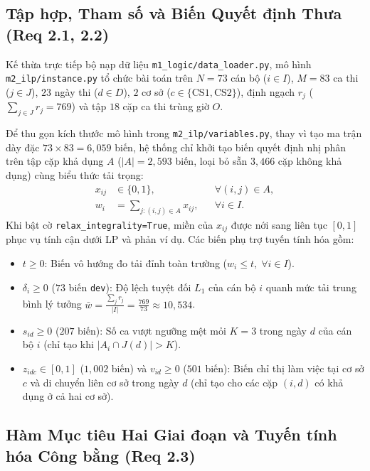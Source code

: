 \subsection{Tập hợp, Tham số và Biến Quyết định Thưa (Req 2.1, 2.2)}
\label{sec:m2_formulation}

Kế thừa trực tiếp bộ nạp dữ liệu \texttt{m1\_logic/data\_loader.py}, mô hình \texttt{m2\_ilp/instance.py} tổ chức bài toán trên $N = 73$ cán bộ ($i \in I$), $M = 83$ ca thi ($j \in J$), $23$ ngày thi ($d \in D$), $2$ cơ sở ($c \in \{\text{CS1}, \text{CS2}\}$), định ngạch $r_j$ ($\sum_{j \in J} r_j = 769$) và tập $18$ cặp ca thi trùng giờ $O$.

Để thu gọn kích thước mô hình trong \texttt{m2\_ilp/variables.py}, thay vì tạo ma trận dày đặc $73 \times 83 = 6{,}059$ biến, hệ thống chỉ khởi tạo biến quyết định nhị phân trên tập cặp khả dụng $A$ ($|A| = 2{,}593$ biến, loại bỏ sẵn $3{,}466$ cặp không khả dụng) cùng biểu thức tải trọng:
\begin{equation}
\begin{aligned}
    x_{ij} &\in \{0, 1\}, && \forall (i, j) \in A, \\
    w_i &= \sum_{j: (i, j) \in A} x_{ij}, && \forall i \in I.
\end{aligned}
\end{equation}
Khi bật cờ \texttt{relax\_integrality=True}, miền của $x_{ij}$ được nới sang liên tục $[0, 1]$ phục vụ tính cận dưới LP và phản ví dụ. Các biến phụ trợ tuyến tính hóa gồm:
\begin{itemize}
    \item $t \ge 0$: Biến vô hướng đo tải đỉnh toàn trường ($w_i \le t, \; \forall i \in I$).
    \item $\delta_i \ge 0$ ($73$ biến \texttt{dev}): Độ lệch tuyệt đối $L_1$ của cán bộ $i$ quanh mức tải trung bình lý tưởng $\bar{w} = \frac{\sum_j r_j}{|I|} = \frac{769}{73} \approx 10{,}534$.
    \item $s_{id} \ge 0$ ($207$ biến): Số ca vượt ngưỡng mệt mỏi $K = 3$ trong ngày $d$ của cán bộ $i$ (chỉ tạo khi $|A_i \cap J(d)| > K$).
    \item $z_{idc} \in [0, 1]$ ($1{,}002$ biến) và $v_{id} \ge 0$ ($501$ biến): Biến chỉ thị làm việc tại cơ sở $c$ và di chuyển liên cơ sở trong ngày $d$ (chỉ tạo cho các cặp $(i, d)$ có khả dụng ở cả hai cơ sở).
\end{itemize}

\subsection{Hàm Mục tiêu Hai Giai đoạn và Tuyến tính hóa Công bằng (Req 2.3)}
\label{sec:m2_objective}

